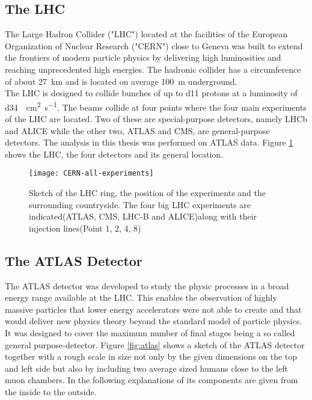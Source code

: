 \subsection{The LHC}

The Large Hadron Collider ("LHC") located at the facilities of the European Organization of Nuclear Research ("CERN") close to Geneva was built to extend the frontiers of modern particle physics by delivering high luminosities and reaching unprecedented high energies. The hadronic collider has a circumference of about \SI{27}{\km} and is located on average \SI{100}{\meter} underground.\\
The LHC is designed to collide bunches of up to \num{d11} protons at a luminosity of \SI{d34}{\per\square\cm \per\s}. The beams collide at four points where the four main experiments of the LHC are located. Two of these are special-purpose detectors, namely LHCb and ALICE while the other two, ATLAS and CMS, are general-purpose detectors.
The analysis in this thesis was performed on ATLAS data.
Figure \ref{fig:LHC} shows the LHC, the four detectors and its general location.
\begin{figure}[h]
  \centering
  \texttt{[image: CERN-all-experiments]}
  \caption[Sketch of the LHC ring, the position of the experiments and
  the surrounding countryside.]{Sketch of the LHC ring, the position
    of the experiments and the surrounding countryside. The four big
    LHC experiments are indicated(ATLAS, CMS, LHC-B and ALICE)along with their injection lines(Point 1, 2, 4, 8)\cite{atlasfigures}}
  \label{fig:LHC}
\end{figure}


\subsection{The ATLAS Detector}

The ATLAS detector was developed to study the physic processes in a broad energy range available at the LHC. This enables the observation of highly massive particles that lower energy accelerators were not able to create and that would deliver new physics theory beyond the standard model of particle physics.
It was designed to cover the maximum number of final stages being a so called general purpose-detector.
Figure \ref{fig:atlas} shows a sketch of the ATLAS detector together with a rough scale in size not only by the given dimensions on the top and left side but also by including two average sized humans close to the left muon chambers. In the following explanations of its components are given from the inside to the outside.

